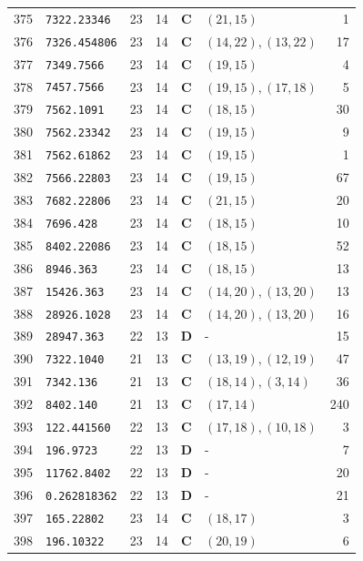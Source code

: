 \documentclass[11pt,a4paper]{article}
\begin{document}
\begin{small}
\begin{longtable}{r l c c c l r}
375 & \texttt{7322.23346} & 23 & 14 & \textbf{C} & $(21,15)$ & 1 \\
376 & \texttt{7326.454806} & 23 & 14 & \textbf{C} & $(14,22), (13,22)$ & 17 \\
377 & \texttt{7349.7566} & 23 & 14 & \textbf{C} & $(19,15)$ & 4 \\
378 & \texttt{7457.7566} & 23 & 14 & \textbf{C} & $(19,15), (17,18)$ & 5 \\
379 & \texttt{7562.1091} & 23 & 14 & \textbf{C} & $(18,15)$ & 30 \\
380 & \texttt{7562.23342} & 23 & 14 & \textbf{C} & $(19,15)$ & 9 \\
381 & \texttt{7562.61862} & 23 & 14 & \textbf{C} & $(19,15)$ & 1 \\
382 & \texttt{7566.22803} & 23 & 14 & \textbf{C} & $(19,15)$ & 67 \\
383 & \texttt{7682.22806} & 23 & 14 & \textbf{C} & $(21,15)$ & 20 \\
384 & \texttt{7696.428} & 23 & 14 & \textbf{C} & $(18,15)$ & 10 \\
385 & \texttt{8402.22086} & 23 & 14 & \textbf{C} & $(18,15)$ & 52 \\
386 & \texttt{8946.363} & 23 & 14 & \textbf{C} & $(18,15)$ & 13 \\
387 & \texttt{15426.363} & 23 & 14 & \textbf{C} & $(14,20), (13,20)$ & 13 \\
388 & \texttt{28926.1028} & 23 & 14 & \textbf{C} & $(14,20), (13,20)$ & 16 \\
389 & \texttt{28947.363} & 22 & 13 & \textbf{D} & - & 15 \\
390 & \texttt{7322.1040} & 21 & 13 & \textbf{C} & $(13,19), (12,19)$ & 47 \\
391 & \texttt{7342.136} & 21 & 13 & \textbf{C} & $(18,14), (3,14)$ & 36 \\
392 & \texttt{8402.140} & 21 & 13 & \textbf{C} & $(17,14)$ & 240 \\
393 & \texttt{122.441560} & 22 & 13 & \textbf{C} & $(17,18), (10,18)$ & 3 \\
394 & \texttt{196.9723} & 22 & 13 & \textbf{D} & - & 7 \\
395 & \texttt{11762.8402} & 22 & 13 & \textbf{D} & - & 20 \\
396 & \texttt{0.262818362} & 22 & 13 & \textbf{D} & - & 21 \\
397 & \texttt{165.22802} & 23 & 14 & \textbf{C} & $(18,17)$ & 3 \\
398 & \texttt{196.10322} & 23 & 14 & \textbf{C} & $(20,19)$ & 6 \\

\end{longtable}
\end{small}
\end{document}
